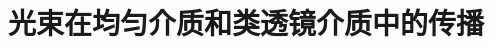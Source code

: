 \documentclass{note}
\begin{document}
\setcounter{chapter}{5}
\fi
\chapter{光束在均匀介质和类透镜介质中的传播}

\ifx\allfiles\undefined
\end{document}

